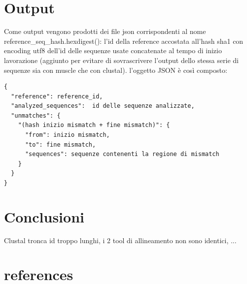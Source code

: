 \documentclass[11pt,italian]{article}
\begin{document}
\section{Output}
Come output vengono prodotti dei file json corrispondenti al nome reference\_seq\_hash.hexdigest(): l'id della reference accostata all'hash sha1 con encoding utf8 dell'id delle sequenze usate concatenate al tempo di inizio lavorazione (aggiunto per evitare di sovrascrivere l'output dello stessa serie di sequenze sia con muscle che con clustal).\newline
l'oggetto JSON è così composto:
\begin{lstlisting}
{
  "reference": reference_id,
  "analyzed_sequences":  id delle sequenze analizzate,
  "unmatches": {
    "(hash inizio mismatch + fine mismatch)": {
      "from": inizio mismatch,
      "to": fine mismatch,
      "sequences": sequenze contenenti la regione di mismatch
    }
  }
}
\end{lstlisting}

\section{Conclusioni}
Clustal tronca id troppo lunghi, i 2 tool di allineamento non sono identici, ...

\section{references}
\end{document}
